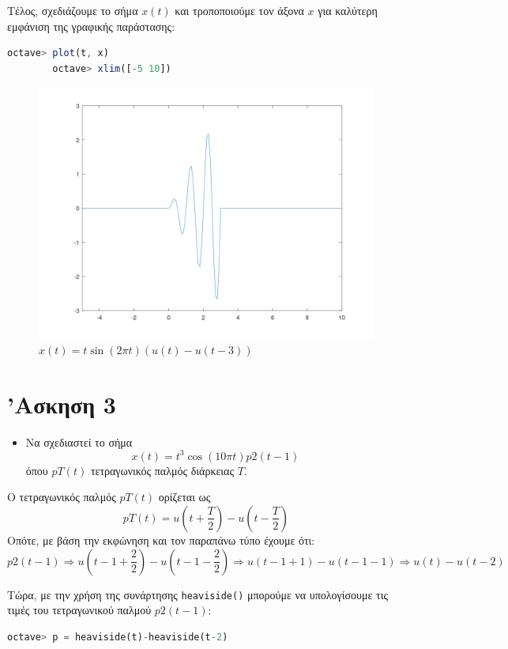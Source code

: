 \documentclass{article}
\begin{document}
Τέλος, σχεδιάζουμε το σήμα $x(t)$ και τροποποιούμε τον άξονα $x$
για καλύτερη εμφάνιση της γραφικής παράστασης:
\begin{lstlisting}[language=octave]
        octave> plot(t, x)
        octave> xlim([-5 10])
\end{lstlisting}

\begin{figure}[H]
        \centering
        \includegraphics[width=\linewidth]{res/fig3.png}
        \caption{$x(t) = t\sin(2\pi t)(u(t) - u(t - 3))$}
\end{figure}

\section{'Ασκηση 3}

\begin{itemize}
        \item Να σχεδιαστεί το σήμα
                \[x(t) = t^3 \cos(10\pi t)p 2(t - 1)\]
                όπου $pT(t)$ τετραγωνικός παλμός διάρκειας $T$.
\end{itemize}

Ο τετραγωνικός παλμός $pT(t)$ ορίζεται ως
\[pT(t) = u(t + \frac{T}{2}) - u(t - \frac{T}{2})\]
Οπότε, με βάση την εκφώνηση και τον παραπάνω τύπο έχουμε ότι:
\[p2(t - 1) \Rightarrow u(t - 1 + \frac{2}{2}) - u(t - 1 - \frac{2}{2})
\Rightarrow u(t - 1 + 1) - u(t - 1 - 1) \Rightarrow u(t) - u(t - 2)\]

Τώρα, με την χρήση της συνάρτησης \lstinline{heaviside()} μπορούμε να
υπολογίσουμε τις τιμές του τετραγωνικού παλμού $p2(t - 1)$:
\begin{lstlisting}[language=octave]
        octave> p = heaviside(t)-heaviside(t-2)
\end{lstlisting}
\end{document}
